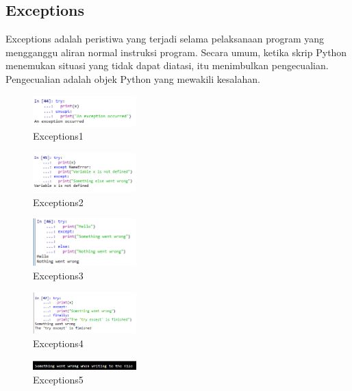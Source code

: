 \subsection{Exceptions}
Exceptions adalah peristiwa yang terjadi selama pelaksanaan program yang mengganggu aliran normal instruksi program. Secara umum, ketika skrip Python menemukan situasi yang tidak dapat diatasi, itu menimbulkan pengecualian. Pengecualian adalah objek Python yang mewakili kesalahan.
\hfill\break

\hfill\break
	\begin{figure}[H]
		\centering
		\includegraphics[width=4cm]{figures/kelompok1/1/dzihan/exc1.PNG}
		\caption{Exceptions1}
	\end{figure}
\hfill\break

\hfill\break
	\begin{figure}[H]
		\centering
		\includegraphics[width=4cm]{figures/kelompok1/1/dzihan/exc2.PNG}
		\caption{Exceptions2}
	\end{figure}
\hfill\break

\hfill\break
	\begin{figure}[H]
		\centering
		\includegraphics[width=4cm]{figures/kelompok1/1/dzihan/exc3.PNG}
		\caption{Exceptions3}
	\end{figure}
\hfill\break

\hfill\break
	\begin{figure}[H]
		\centering
		\includegraphics[width=4cm]{figures/kelompok1/1/dzihan/exc4.PNG}
		\caption{Exceptions4}
	\end{figure}
\hfill\break

\hfill\break
	\begin{figure}[H]
		\centering
		\includegraphics[width=4cm]{figures/kelompok1/1/dzihan/exc5.PNG}
		\caption{Exceptions5}
	\end{figure}

